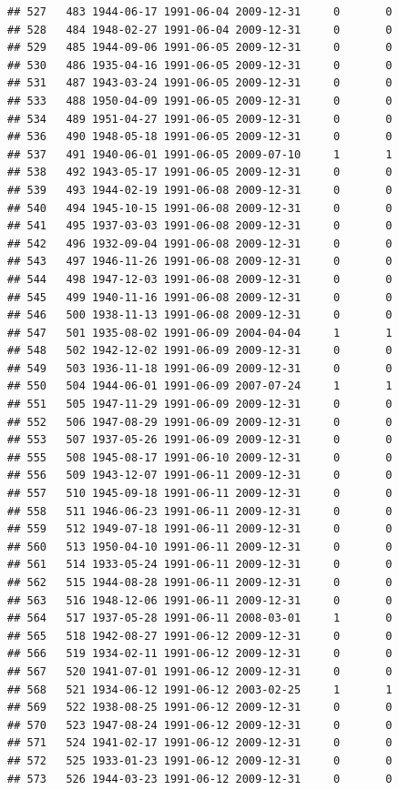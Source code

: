 \documentclass[
]{book}
\begin{document}
\begin{verbatim}
## 527   483 1944-06-17 1991-06-04 2009-12-31     0       0
## 528   484 1948-02-27 1991-06-04 2009-12-31     0       0
## 529   485 1944-09-06 1991-06-05 2009-12-31     0       0
## 530   486 1935-04-16 1991-06-05 2009-12-31     0       0
## 531   487 1943-03-24 1991-06-05 2009-12-31     0       0
## 533   488 1950-04-09 1991-06-05 2009-12-31     0       0
## 534   489 1951-04-27 1991-06-05 2009-12-31     0       0
## 536   490 1948-05-18 1991-06-05 2009-12-31     0       0
## 537   491 1940-06-01 1991-06-05 2009-07-10     1       1
## 538   492 1943-05-17 1991-06-05 2009-12-31     0       0
## 539   493 1944-02-19 1991-06-08 2009-12-31     0       0
## 540   494 1945-10-15 1991-06-08 2009-12-31     0       0
## 541   495 1937-03-03 1991-06-08 2009-12-31     0       0
## 542   496 1932-09-04 1991-06-08 2009-12-31     0       0
## 543   497 1946-11-26 1991-06-08 2009-12-31     0       0
## 544   498 1947-12-03 1991-06-08 2009-12-31     0       0
## 545   499 1940-11-16 1991-06-08 2009-12-31     0       0
## 546   500 1938-11-13 1991-06-08 2009-12-31     0       0
## 547   501 1935-08-02 1991-06-09 2004-04-04     1       1
## 548   502 1942-12-02 1991-06-09 2009-12-31     0       0
## 549   503 1936-11-18 1991-06-09 2009-12-31     0       0
## 550   504 1944-06-01 1991-06-09 2007-07-24     1       1
## 551   505 1947-11-29 1991-06-09 2009-12-31     0       0
## 552   506 1947-08-29 1991-06-09 2009-12-31     0       0
## 553   507 1937-05-26 1991-06-09 2009-12-31     0       0
## 555   508 1945-08-17 1991-06-10 2009-12-31     0       0
## 556   509 1943-12-07 1991-06-11 2009-12-31     0       0
## 557   510 1945-09-18 1991-06-11 2009-12-31     0       0
## 558   511 1946-06-23 1991-06-11 2009-12-31     0       0
## 559   512 1949-07-18 1991-06-11 2009-12-31     0       0
## 560   513 1950-04-10 1991-06-11 2009-12-31     0       0
## 561   514 1933-05-24 1991-06-11 2009-12-31     0       0
## 562   515 1944-08-28 1991-06-11 2009-12-31     0       0
## 563   516 1948-12-06 1991-06-11 2009-12-31     0       0
## 564   517 1937-05-28 1991-06-11 2008-03-01     1       0
## 565   518 1942-08-27 1991-06-12 2009-12-31     0       0
## 566   519 1934-02-11 1991-06-12 2009-12-31     0       0
## 567   520 1941-07-01 1991-06-12 2009-12-31     0       0
## 568   521 1934-06-12 1991-06-12 2003-02-25     1       1
## 569   522 1938-08-25 1991-06-12 2009-12-31     0       0
## 570   523 1947-08-24 1991-06-12 2009-12-31     0       0
## 571   524 1941-02-17 1991-06-12 2009-12-31     0       0
## 572   525 1933-01-23 1991-06-12 2009-12-31     0       0
## 573   526 1944-03-23 1991-06-12 2009-12-31     0       0

\end{verbatim}
\end{document}
